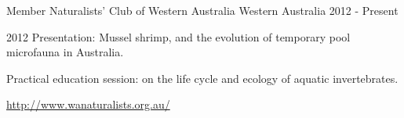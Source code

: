 \begin{cventries}
  \cventry
    {Member} %
    {Naturalists' Club of Western Australia} %
    {Western Australia} %
    {2012 - Present} %
    {
      \begin{cvitems} %
        \item {2012 Presentation: Mussel shrimp, and the evolution of temporary pool microfauna in Australia.}
        \item {Practical education session: on the life cycle and ecology of aquatic invertebrates.}
        \item {\href{http://www.wanaturalists.org.au/}{http://www.wanaturalists.org.au/}}
      \end{cvitems}
    }

\end{cventries}
